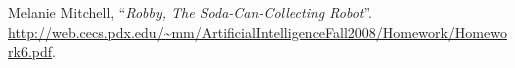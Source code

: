 \begin{thebibliography}{1}
	
	Melanie Mitchell,\newline
	``\textit{Robby, The Soda-Can-Collecting Robot}''.\newline
	\url{http://web.cecs.pdx.edu/~mm/ArtificialIntelligenceFall2008/Homework/Homework6.pdf}.
	
\end{thebibliography}
